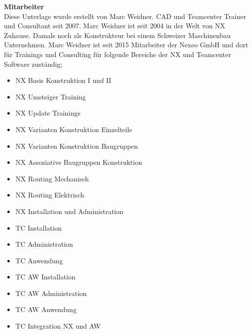 \textbf{Mitarbeiter}\\
Diese Unterlage wurde erstellt von Marc Weidner. CAD und Teamcenter Trainer und Consultant seit 2007. Marc Weidner ist seit 2004 in der Welt von NX \textsuperscript{\texttrademark} Zuhause. Damals noch als Konstrukteur bei einem Schweizer Maschinenbau Unternehmen. Marc Weidner ist seit 2015 Mitarbeiter der Nexeo GmbH und dort für Trainings und Consulting für folgende Bereiche der NX \textsuperscript{\texttrademark} und Teamcenter \textsuperscript{\texttrademark} Software zuständig;\\
\begin{itemize}
	\item NX \textsuperscript{\texttrademark} Basis Konstruktion I und II
	\item NX \textsuperscript{\texttrademark} Umsteiger Training
	\item NX \textsuperscript{\texttrademark} Update Trainings
	\item NX \textsuperscript{\texttrademark} Varianten Konstruktion Einzelteile
	\item NX \textsuperscript{\texttrademark} Varianten Konstruktion Baugruppen
	\item NX \textsuperscript{\texttrademark} Assoziative Baugruppen Konstruktion
	\item NX \textsuperscript{\texttrademark} Routing Mechanisch
	\item NX \textsuperscript{\texttrademark} Routing Elektrisch
	\item NX \textsuperscript{\texttrademark} Installation und Administration
	\item TC \textsuperscript{\texttrademark} Installation
	\item TC \textsuperscript{\texttrademark} Administration
	\item TC \textsuperscript{\texttrademark} Anwendung
	\item TC \textsuperscript{\texttrademark} AW Installation
	\item TC \textsuperscript{\texttrademark} AW Administration
	\item TC \textsuperscript{\texttrademark} AW Anwendung
	\item TC \textsuperscript{\texttrademark} Integration NX und AW \textsuperscript{\texttrademark}
\end{itemize}









